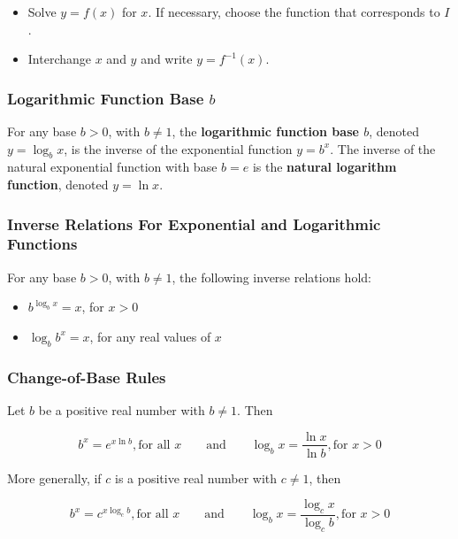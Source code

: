 \begin{itemize}
    \item Solve $y = f(x)$ for $x$. If necessary, choose the function that corresponds to $I$.
    \item Interchange $x$ and $y$ and write $y = f^{-1}(x)$.
\end{itemize}

\subsubsection{Logarithmic Function Base $b$}
For any base $b > 0$, with $b \neq 1$, the \textbf{logarithmic function base $b$}, denoted $y = \log _b x$, is the inverse of the exponential function $y = b^x$. The inverse of the natural exponential function with base $b = e$ is the \textbf{natural logarithm function}, denoted $y = \ln x$.

\subsubsection{Inverse Relations For Exponential and Logarithmic Functions}
For any base $b > 0$, with $b \neq 1$, the following inverse relations hold:

\begin{itemize}
    \item $b^{\log _b x} = x$, for $x > 0$
    \item $\log _b b^x = x$, for any real values of $x$
\end{itemize}

\subsubsection{Change-of-Base Rules}
Let $b$ be a positive real number with $b \neq 1$. Then

\begin{equation*}
b^x = e^{x \ln b}, \text{for all $x$} \qquad \text{and} \qquad \log _b x = \frac{\ln x}{\ln b}, \text{for $x > 0$}
\end{equation*}

More generally, if $c$ is a positive real number with $c \neq 1$, then

\begin{equation*}
    b^x = c^{x \log _c b}, \text{for all $x$} \qquad \text{and} \qquad \log _b x = \frac{\log_c x}{\log_c b}, \text{for $x > 0$}
\end{equation*}